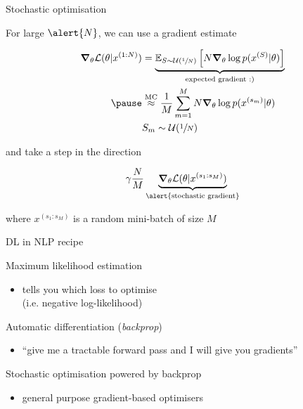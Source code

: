 \begin{frame}{Stochastic optimisation}


For large $\alert{N}$, we can use a gradient estimate 
\begin{small}
\begin{equation*}
\begin{aligned}
\grad_\theta \mathcal L(\theta|x^{(1:N)}) 
 &=  \underbrace{\mathbb E_{S\sim \mathcal U(\sfrac{1}{N})}\left[ N \grad_\theta  \log p(x^{(S)}|\theta)\right]}_{\text{expected gradient :)}} \\ \pause
 &\overset{\text{MC}}{\approx} \frac{1}{M} \sum_{m=1}^M N  \grad_\theta \log p(x^{(s_m)}|\theta) \\
 &S_m \sim \mathcal U(\sfrac{1}{N})
\end{aligned}
\end{equation*}
\end{small}  \pause
and take a step in the direction
\begin{small}
\begin{equation*}
\gamma \frac{N}{M} \underbrace{\grad_\theta \mathcal L(\theta|x^{(s_1:s_M)})}_{\text{\alert{stochastic gradient}}}
\end{equation*}
\end{small}
where $x^{(s_1:s_M)}$ is a random mini-batch of size $M$


\end{frame}




\begin{frame}{DL in NLP recipe}



	Maximum likelihood estimation
	\begin{itemize}
		\item  tells you which \alert{loss} to optimise \\
		(i.e. negative log-likelihood)
	\end{itemize}
	
	Automatic differentiation (\emph{backprop})
	\begin{itemize}
		\item ``give me a tractable forward pass and I will give you \alert{gradients}''
	\end{itemize}
	
	Stochastic optimisation powered by backprop
	\begin{itemize}
		\item general purpose gradient-based optimisers
	\end{itemize}

\end{frame}


